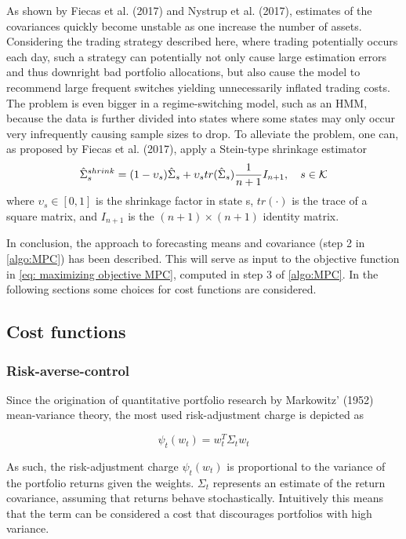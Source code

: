 As shown by Fiecas et al. (2017) and Nystrup et al. (2017), estimates of the covariances quickly become unstable as one increase the number of assets. Considering the trading strategy described here, where trading potentially occurs each day, such a strategy can potentially not only cause large estimation errors and thus downright bad portfolio allocations, but also cause the model to recommend large frequent switches yielding unnecessarily inflated trading costs. The problem is even bigger in a regime-switching model, such as an HMM, because the data is further divided into states where some states may only occur very infrequently causing sample sizes to drop. To alleviate the problem, one can, as proposed by Fiecas et al. (2017), apply a Stein-type shrinkage estimator
\begin{equation}
    \hat\Sigma_s^{shrink} = (1-\upsilon_s)\hat\Sigma_s + \upsilon_s tr(\hat\Sigma_s) \frac{1}{n+1} I_{n+1},
    \quad s \in\operatorname{\mathcal{K}}
\end{equation}
where $\upsilon_s\in[0,1]$ is the shrinkage factor in state s, $tr(\cdot)$ is the trace of a square matrix, and $I_{n+1}$ is the $(n+1)\times (n+1)$ identity matrix.

In conclusion, the approach to forecasting means and covariance (step 2 in \cref{algo:MPC}) has been described. This will serve as input to the objective function in \cref{eq: maximizing objective MPC}, computed in step 3 of \cref{algo:MPC}. In the following sections some choices for cost functions are considered.

\subsection{Cost functions}

\subsubsection{Risk-averse-control}
Since the origination of quantitative portfolio research by Markowitz' (1952) mean-variance theory, the most used risk-adjustment charge is depicted as

\begin{equation}
    \psi_t(w_t) = w_t^T\Sigma_tw_t
    \label{eq: MPC quadratic risk}
\end{equation}

As such, the risk-adjustment charge $\psi_t(w_t)$ is proportional to the variance of the portfolio returns given the weights. $\Sigma_t$ represents an estimate of the return covariance, assuming that returns behave stochastically. Intuitively this means that the term can be considered a cost that discourages portfolios with high variance. 

